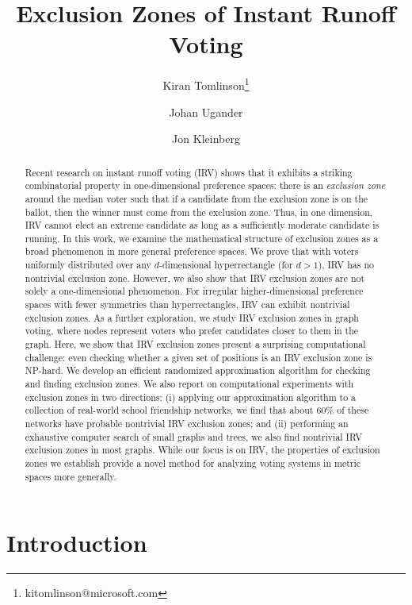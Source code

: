 \documentclass{article}
\title{Exclusion Zones of Instant Runoff Voting}
\author[1]{Kiran Tomlinson\thanks{kitomlinson@microsoft.com}}
\author[2]{Johan Ugander}
\author[3]{Jon Kleinberg}
\affil[1]{Microsoft Research}
\affil[2]{Stanford University}
\affil[3]{Cornell University}
\date{}
\theoremstyle{theorem}
\theoremstyle{definition}
\begin{document}
\maketitle

\begin{abstract}
Recent research on instant runoff voting (IRV) shows that it exhibits a striking combinatorial property in one-dimensional preference spaces: there is an {\em exclusion zone} around the median voter such that if a candidate from the exclusion zone is on the ballot, then the winner must come from the exclusion zone. Thus, in one dimension, IRV cannot elect an extreme candidate as long as a sufficiently moderate candidate is running. In this work, we examine the mathematical structure of exclusion zones as a broad phenomenon in more general preference spaces. We prove that with voters uniformly distributed over any $d$-dimensional hyperrectangle (for $d > 1$), IRV has no nontrivial exclusion zone. However, we also show that IRV exclusion zones are not solely a one-dimensional phenomenon. For irregular higher-dimensional preference spaces with fewer symmetries than hyperrectangles, IRV can exhibit nontrivial exclusion zones. As a further exploration, we study IRV exclusion zones in graph voting, where nodes represent voters who prefer candidates closer to them in the graph. Here, we show that IRV exclusion zones present a surprising computational challenge: even checking whether a given set of positions is an IRV exclusion zone is NP-hard. We develop an efficient randomized approximation algorithm for checking and finding exclusion zones. We also report on computational experiments with exclusion zones in two directions: (i) applying our approximation algorithm to a collection of real-world school friendship networks, we find that about 60\% of these networks have probable nontrivial IRV exclusion zones; and (ii) performing an exhaustive computer search of small graphs and trees, we also find nontrivial IRV exclusion zones in most graphs. While our focus is on IRV, the properties of exclusion zones we establish provide a novel method for analyzing voting systems in metric spaces more generally.
\end{abstract}

\section{Introduction}
\end{document}
